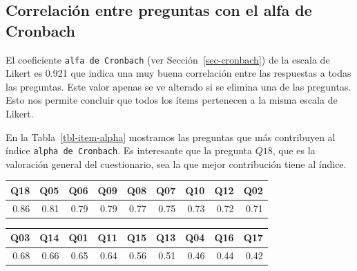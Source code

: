 \documentclass[
  12pt,
  a4paper,
  extrafontsizes,
  onecolumn,
  openright]{memoir}
\begin{document}
\hypertarget{sec-cronbach-2}{%
\subsection{Correlación entre preguntas con el alfa de
Cronbach}\label{sec-cronbach-2}}

\scriptsize

\normalsize

El coeficiente \texttt{alfa\ de\ Cronbach} (ver
Sección~\ref{sec-cronbach}) de la escala de Likert es 0.921 que indica
una muy buena correlación entre las respuestas a todas las preguntas.
Este valor apenas se ve alterado si se elimina una de las preguntas.
Esto nos permite concluir que todos los ítems pertenecen a la misma
escala de Likert.

En la Tabla~\ref{tbl-item-alpha} mostramos las preguntas que más
contribuyen al índice \texttt{alpha\ de\ Cronbach}. Es interesante que
la pregunta \(Q18\), que es la valoración general del cuestionario, sea
la que mejor contribución tiene al índice.

\tiny

\begin{table}

\caption{\label{tbl-item-alpha}Relación de cada pregunta con el índice
alpha de Cronbach.}\begin{minipage}[t]{\linewidth}

{\centering 

\begin{longtable}{rrrrrrrrr}
\tabularnewline

\toprule
Q18 & Q05 & Q06 & Q09 & Q08 & Q07 & Q10 & Q12 & Q02 \\ 
\midrule
0.86 & 0.81 & 0.79 & 0.79 & 0.77 & 0.75 & 0.73 & 0.72 & 0.71 \\ 
\bottomrule
\end{longtable}

}

\end{minipage}%
\newline
\begin{minipage}[t]{\linewidth}

{\centering 

\begin{longtable}{rrrrrrrrr}
\tabularnewline

\toprule
Q03 & Q14 & Q01 & Q11 & Q15 & Q13 & Q04 & Q16 & Q17 \\ 
\midrule
0.68 & 0.66 & 0.65 & 0.64 & 0.56 & 0.51 & 0.46 & 0.44 & 0.42 \\ 
\bottomrule
\end{longtable}

}

\end{minipage}%

\end{table}
\end{document}

